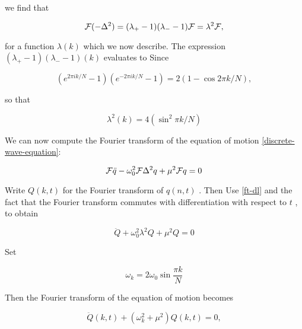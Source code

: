 we  find  that



\begin{equation}
\label{ft-dl}
\mathcal{F}(-\Delta^2) = (\lambda_+ - 1)(\lambda_- -1)\mathcal{F} =  \lambda^2\mathcal{F},
\end{equation}


for  a  function   $\lambda(k)$  which  we  now  describe.   The  expression
  $(\lambda_+ - 1)(\lambda_- -1)(k)$  evaluates  to
 Since



\begin{equation}
(e^{2\pi i k/N} - 1)(e^{-2\pi i k/N} - 1) = 2(1 - \cos2\pi k/N),
\end{equation}


so  that



\begin{equation}
\lambda^2(k)  = 4(\sin^2 \pi k/N)
\end{equation}


We  can  now  compute  the  Fourier  transform  of  the  equation  of  motion   \eqref{discrete-wave-equation}:



\begin{equation}
\mathcal{F}\ddot q - \omega_0^2 \mathcal{F} \Delta^2 q + \mu^2 \mathcal{F} q = 0
\end{equation}


Write   $Q(k,t)$  for  the  Fourier  transform  of   $q(n,t)$ .   Then
 Use   \eqref{ft-dl} and  the  fact  that  the  Fourier  transform  commutes  with  differentiation  with  respect  to   $t$ ,  to  obtain



\begin{equation}
\ddot Q + \omega_0^2 \lambda^2 Q + \mu^2 Q = 0
\end{equation}


Set



\begin{equation}
\omega_k = 2\omega_0 \sin  \frac{\pi k}{N}
\end{equation}


Then  the  Fourier  transform  of  the  equation  of  motion  becomes



\begin{equation}
\label{eq-mo-uncoupled}
\ddot Q(k,t) +  (\omega_k^2 + \mu^2) Q(k,t) = 0,
\end{equation}


